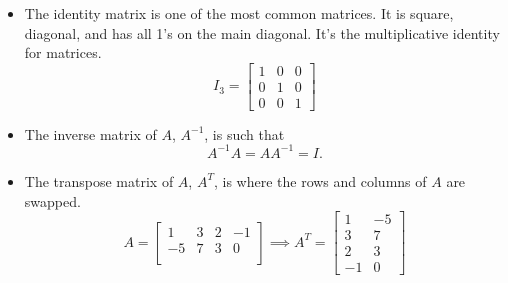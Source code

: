 \begin{itemize}
\begin{equation*}
		\end{equation*}
	\item The identity matrix is one of the most common matrices. It is square, diagonal, and has all 1's on the main diagonal. It's the multiplicative identity for matrices.
		\begin{equation*}
			I_3 = \begin{bmatrix}
				1 & 0 & 0 \\
				0 & 1 & 0 \\
				0 & 0 & 1
			\end{bmatrix}
		\end{equation*}
	\item The inverse matrix of $A$, $A^{-1}$, is such that
		\begin{equation*}
			A^{-1}A = AA^{-1} = I.
		\end{equation*}
	\item The transpose matrix of $A$, $A^T$, is where the rows and columns of $A$ are swapped.
		\begin{equation*}
			A = \begin{bmatrix}
				1 & 3 & 2 & -1 \\
				-5 & 7 & 3 & 0 \\
			\end{bmatrix} \implies A^T = \begin{bmatrix}
				1 & -5 \\
				3 & 7 \\
				2 & 3 \\
				-1 & 0
			\end{bmatrix}
		\end{equation*}
\end{itemize}